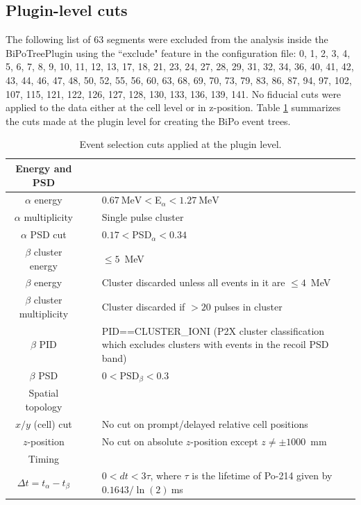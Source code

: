 \subsection{Plugin-level cuts}
The following list of 63 segments were excluded from the analysis inside the BiPoTreePlugin using the ``exclude" feature in the configuration file: 0, 1, 2, 3, 4, 5, 6, 7, 8, 9, 10, 11, 12, 13, 17, 18, 21, 23, 24, 27, 28, 29, 31, 32, 34, 36, 40, 41, 42, 43, 44, 46, 47, 48, 50, 52, 55, 56, 60, 63, 68, 69, 70, 73, 79, 83, 86, 87, 94, 97, 102, 107, 115, 121, 122, 126, 127, 128, 130, 133, 136, 139, 141. No fiducial cuts were applied to the data either at the cell level or in z-position.
Table \ref{tab:plugincuts} summarizes the cuts made at the plugin level for creating the BiPo event trees.
\begin{table}
\begin{center}
\caption{\label{tab:plugincuts}Event selection cuts applied at the plugin level.}
\begin{tabular}[ht]{c c p{10.5cm}}\hline
Energy and PSD&~&~\\\hline\hline
$\alpha$ energy &\vline& $0.67~\textrm{MeV}<$E$_{\alpha}<1.27~\textrm{MeV}$\\
$\alpha$ multiplicity &\vline& Single pulse cluster\\
$\alpha$ PSD cut& \vline&$0.17<$PSD$_{\alpha}<0.34$\\
$\beta$ cluster energy &\vline& $\leq 5$~MeV\\
$\beta$ energy & \vline&Cluster discarded unless all events in it are $\leq 4$~MeV\\
$\beta$ cluster multiplicity & \vline&Cluster discarded if $>20$ pulses in cluster\\
$\beta$ PID & \vline&PID==CLUSTER\_IONI (P2X cluster classification which excludes clusters with events in the recoil PSD band)\\
$\beta$ PSD & \vline&$0<\textrm{PSD}_{\beta}<0.3$\\\hline
Spatial topology&~&~\\\hline\hline
$x/y$ (cell) cut &\vline& No cut on prompt/delayed relative cell positions\\
$z$-position&\vline& No cut on absolute $z$-position except $z\neq \pm1000$~mm\\
Timing&~&~\\\hline\hline	
$\Delta t=t_{\alpha}-t_{\beta}$&\vline &$0< dt < 3\tau$, where $\tau$ is the lifetime of Po-214 given by $0.1643/\ln{(2)}~$ms\\\hline

\end{tabular}
\end{center}
\end{table}
